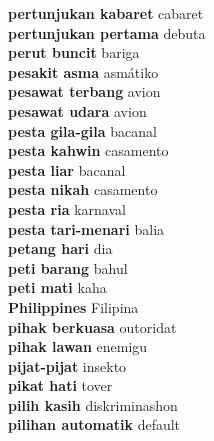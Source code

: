 \textbf{ pertunjukan kabaret  } cabaret \\
\textbf{ pertunjukan pertama  } debuta \\
\textbf{ perut buncit  } bariga \\
\textbf{ pesakit asma  } asmátiko \\
\textbf{ pesawat terbang  } avion \\
\textbf{ pesawat udara  } avion \\
\textbf{ pesta gila-gila  } bacanal \\
\textbf{ pesta kahwin  } casamento \\
\textbf{ pesta liar  } bacanal \\
\textbf{ pesta nikah  } casamento \\
\textbf{ pesta ria  } karnaval \\
\textbf{ pesta tari-menari  } balia \\
\textbf{ petang hari  } dia \\
\textbf{ peti barang  } bahul \\
\textbf{ peti mati  } kaha \\
\textbf{ Philippines  } Filipina \\
\textbf{ pihak berkuasa  } outoridat \\
\textbf{ pihak lawan  } enemigu \\
\textbf{ pijat-pijat  } insekto \\
\textbf{ pikat hati  } tover \\
\textbf{ pilih kasih  } diskriminashon \\
\textbf{ pilihan automatik  } default \\

